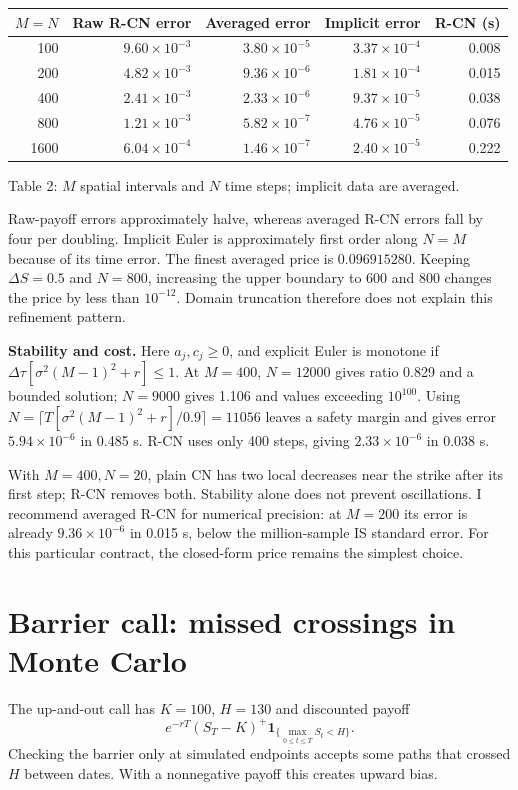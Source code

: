 \documentclass[12pt]{article}
\theoremstyle{definition}
\newcommand{\ind}{\mathbf{1}}
\begin{document}
\begin{center}
\setlength{\tabcolsep}{4pt}
\begin{tabular}{rrrrr}
\hline
$M=N$&Raw R-CN error&Averaged error&Implicit error&R-CN (s)\\\hline
100 & $9.60\times10^{-3}$ & $3.80\times10^{-5}$ & $3.37\times10^{-4}$ & 0.008 \\
200 & $4.82\times10^{-3}$ & $9.36\times10^{-6}$ & $1.81\times10^{-4}$ & 0.015 \\
400 & $2.41\times10^{-3}$ & $2.33\times10^{-6}$ & $9.37\times10^{-5}$ & 0.038 \\
800 & $1.21\times10^{-3}$ & $5.82\times10^{-7}$ & $4.76\times10^{-5}$ & 0.076 \\
1600 & $6.04\times10^{-4}$ & $1.46\times10^{-7}$ & $2.40\times10^{-5}$ & 0.222 \\
\hline
\end{tabular}

Table 2: $M$ spatial intervals and $N$ time steps; implicit data are averaged.
\end{center}

Raw-payoff errors approximately halve, whereas averaged R-CN errors fall by four
per doubling. Implicit Euler is approximately first order along $N=M$ because of its
time error. The finest averaged price is $0.096915280$. Keeping $\Delta S=0.5$ and
$N=800$, increasing the upper boundary to 600 and 800 changes the price by less than
$10^{-12}$. Domain truncation therefore does not explain this refinement pattern.

\textbf{Stability and cost.} Here $a_j,c_j\geq0$, and explicit Euler is monotone if
$\Delta\tau[\sigma^2(M-1)^2+r]\leq1$. At $M=400$, $N=12000$ gives ratio 0.829 and
a bounded solution; $N=9000$ gives 1.106 and values exceeding $10^{100}$.
Using $N=\lceil T[\sigma^2(M-1)^2+r]/0.9\rceil=11056$ leaves a safety margin
and gives error $5.94\times10^{-6}$ in 0.485 s.
R-CN uses only 400 steps, giving $2.33\times10^{-6}$ in 0.038 s.

With $M=400,N=20$, plain CN has two local decreases near the strike after its first
step; R-CN removes both. Stability alone does not prevent oscillations. I recommend
averaged R-CN for numerical precision: at $M=200$ its error is already
$9.36\times10^{-6}$ in 0.015 s, below the million-sample IS standard error.
For this particular contract, the closed-form price remains the simplest choice.

\newpage
\section{Barrier call: missed crossings in Monte Carlo}
The up-and-out call has $K=100$, $H=130$ and discounted payoff
\[e^{-rT}(S_T-K)^+\ind_{\{\max_{0\leq t\leq T}S_t<H\}}.\]
Checking the barrier only at simulated endpoints accepts some paths that crossed
$H$ between dates. With a nonnegative payoff this creates upward bias.
\end{document}
